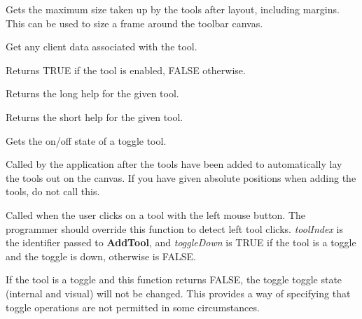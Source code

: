 

Gets the maximum size taken up by the tools after layout, including margins.
This can be used to size a frame around the toolbar canvas.



Get any client data associated with the tool.



Returns TRUE if the tool is enabled, FALSE otherwise.



Returns the long help for the given tool.



Returns the short help for the given tool.



Gets the on/off state of a toggle tool.



Called by the application after the tools have been added to
automatically lay the tools out on the canvas. If you have given
absolute positions when adding the tools, do not call this.



Called when the user clicks on a tool with the left mouse button. The
programmer should override this function to detect left tool clicks. {\it
toolIndex} is the identifier passed to {\bf AddTool}, and {\it
toggleDown} is TRUE if the tool is a toggle and the toggle is down,
otherwise is FALSE.

If the tool is a toggle and this function returns FALSE, the toggle
toggle state (internal and visual) will not be changed. This provides a way of
specifying that toggle operations are not permitted in some circumstances.

